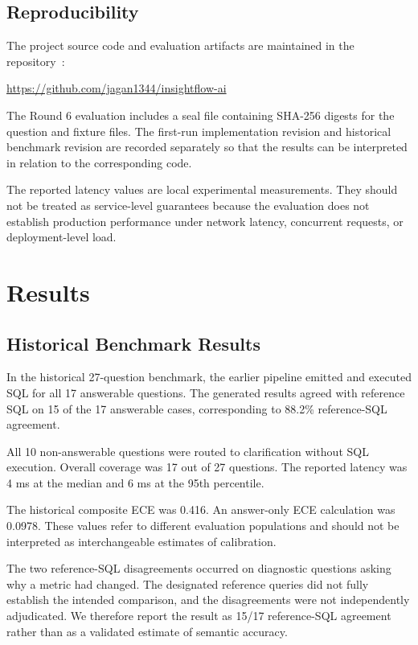 \documentclass[conference]{IEEEtran}
\begin{document}
\subsection{Reproducibility}

The project source code and evaluation artifacts are maintained in the repository~\cite{insightflowrepo}:

\url{https://github.com/jagan1344/insightflow-ai}

The Round 6 evaluation includes a seal file containing SHA-256 digests for the question and fixture files. The first-run implementation revision and historical benchmark revision are recorded separately so that the results can be interpreted in relation to the corresponding code.

The reported latency values are local experimental measurements. They should not be treated as service-level guarantees because the evaluation does not establish production performance under network latency, concurrent requests, or deployment-level load.

\section{Results}

\subsection{Historical Benchmark Results}

In the historical 27-question benchmark, the earlier pipeline emitted and executed SQL for all 17 answerable questions. The generated results agreed with reference SQL on 15 of the 17 answerable cases, corresponding to 88.2\% reference-SQL agreement.

All 10 non-answerable questions were routed to clarification without SQL execution. Overall coverage was 17 out of 27 questions. The reported latency was 4 ms at the median and 6 ms at the 95th percentile.

The historical composite ECE was 0.416. An answer-only ECE calculation was 0.0978. These values refer to different evaluation populations and should not be interpreted as interchangeable estimates of calibration.

The two reference-SQL disagreements occurred on diagnostic questions asking why a metric had changed. The designated reference queries did not fully establish the intended comparison, and the disagreements were not independently adjudicated. We therefore report the result as 15/17 reference-SQL agreement rather than as a validated estimate of semantic accuracy.
\end{document}
